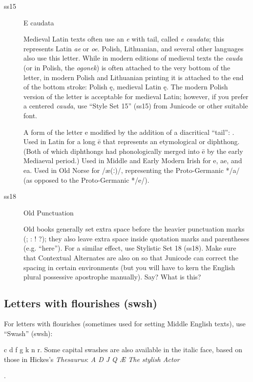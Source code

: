 \begin{description}
\item[ss15] E caudata 

Medieval Latin texts often use an {\itshape e} with tail, called
{\itshape e caudata}; this represents Latin {\itshape ae} or {\itshape
  oe}. Polish, Lithuanian, and several other languages also use this
letter. While in modern editions of medieval texts the {\itshape
  cauda} (or in Polish, the {\itshape ogonek}) is often attached to
the very bottom of the letter, in modern Polish and Lithuanian
printing it is attached to the end of the bottom stroke: Polish ę,
medieval Latin {ę}. The modern
Polish version of the letter is acceptable for medieval Latin;
however, if you prefer a centered {\itshape cauda}, use
“Style Set 15” (ss15) from Junicode or other suitable font.

A form of the letter e modified by the addition of a diacritical “tail”: .
Used in Latin for a long ē that represents an etymological  or  diphthong. (Both of which diphthongs had phonologically merged into ē by the early Mediaeval period.)
Used in Middle and Early Modern Irish for e, ae, and ea.
Used in Old Norse for /æ(ː)/, representing the Proto-Germanic */a/ (as opposed to the Proto-Germanic */e/).

\item [ss18] Old Punctuation

{


Old books generally set
extra space before the heavier punctuation marks (; : ! ?);
they also leave extra space inside quotation marks and
parentheses (e.g. “here”). For a similar effect, use Stylistic Set 18 (ss18). Make sure
that Contextual Alternates are also on so that Junicode can correct
the spacing in certain environments (but you will have to kern the English plural
possessive apostrophe manually). Say? What is this?

}

\end{description}

\subsection*{Letters with flourishes (swsh)}
For letters with flourishes (sometimes used for setting Middle English
texts), use “Swash” (swsh):
{c d f g k n r. Some capital swashes are also
available in the italic face, based on those in Hickes's \textit{Thesaurus}:
\textit{A D J Q Æ
  The stylish Actor}  


}.

